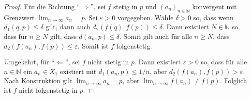 \documentclass[../main.tex]{subfiles}
\begin{document}
\begin{proof}
  Für die Richtung ``$\Rightarrow$'',
  sei $f$ stetig in $p$ und ${(a_{n})}_{n \in \mathbb{N}}$
  konvergent mit Grenzwert 
  $\lim_{n \to \infty} a_n = p$.
  Sei $\varepsilon > 0$ vorgegeben.
  Wähle $\delta > 0$ so, dass wenn
  $d_1(q, p) \leq \delta$ gilt,
  dann auch $d_2(f(q), f(p)) \leq \delta$.
  Dann existiert $N \in \mathbb{N}$ so,
  dass für $n \geq N$ gilt, dass
  $d(a_n, p) \leq \delta$.
  Somit gilt auch für alle $n \geq N$,
  dass $d_2(f(a_n), f(p)) \leq \varepsilon$.
  Somit ist $f$ folgenstetig.

  Umgekehrt, für ``$\Leftarrow$'',
  sei $f$ nicht stetig in $p$.
  Dann existiert $\varepsilon > 0$ so,
  dass für alle $n \in \mathbb{N}$ ein
  $a_n \in X_1$ existiert mit
  $d_1(a_n, p) \leq 1/n$, aber
  $d_2(f(a_n), f(p)) > \varepsilon$.
  Nach Konstruktion gilt
  $\lim_{n \to \infty}a_n = p$,
  aber $\lim_{n \to \infty}f(a_n) \neq f(p)$.
  Folglich ist $f$ nicht folgenstetig in $p$.
\end{proof}
\end{document}
